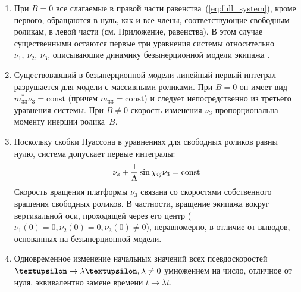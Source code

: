 \begin{enumerate}[wide]
    \item При $B = 0$ все слагаемые в правой части равенства~(\ref{eq:full_system}), кроме первого, обращаются в нуль, как и все члены, соответствующие свободным роликам, в левой части (см. Приложение, равенства). В этом случае существенными остаются первые три уравнения системы относительно $\nu_1,\ \nu_2,\ \nu_3$, описывающие динамику безынерционной модели экипажа \cite{ZobovaTatarinovPMM}.
    \item Существовавший в безынерционной модели линейный первый интеграл разрушается для модели с массивными роликами. При $B = 0$ он имеет вид $m_{33}^*\nu_3 = \mathrm{const}$ (причем $m_{33} = \mathrm{const}$) и следует непосредственно из третьего уравнения системы. При $B\neq 0$ скорость изменения $\nu_3$ пропорциональна моменту инерции ролика~$B$.
    \item Поскольку скобки Пуассона в уравнениях для свободных роликов равны нулю, система допускает первые интегралы:
    \begin{equation}
        \label{int_free_roller}
    \nu_s + \displaystyle\frac{\displaystyle 1}{\displaystyle \Lambda}\sin\chi_{ij}\nu_3 = \mathrm{const}
    \end{equation}
    Скорость вращения платформы $\nu_3$ связана со скоростями собственного вращения свободных роликов. В частности, вращение экипажа вокруг вертикальной оси, проходящей через его центр ($\nu_1(0) = 0, \nu_2(0) = 0, \nu_3(0) \neq 0$), неравномерно, в отличие от выводов, основанных на безынерционной модели.
    \item Одновременное изменение начальных значений всех псевдоскоростей $\vnu \rightarrow \lambda\vnu, \lambda \neq 0$ умножением на число, отличное от нуля, эквивалентно замене времени $t \rightarrow \lambda t$.
\end{enumerate}


